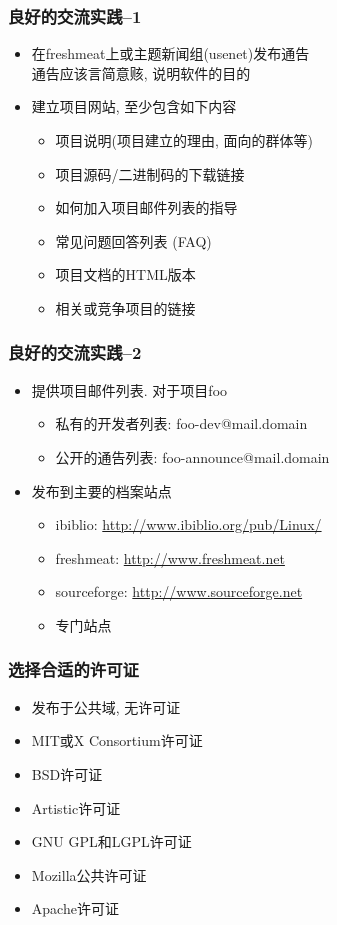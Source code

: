 \documentclass[compress]{beamer}
\begin{document}
\begin{frame}
\frametitle{良好的交流实践--1}
\begin{itemize}
\item 在freshmeat上或主题新闻组(usenet)发布通告\\
通告应该言简意赅, 说明软件的目的
\item 建立项目网站, 至少包含如下内容
    \begin{itemize}
    \item 项目说明(项目建立的理由, 面向的群体等)
    \item 项目源码/二进制码的下载链接
    \item 如何加入项目邮件列表的指导
    \item 常见问题回答列表 (FAQ)
    \item 项目文档的HTML版本
    \item 相关或竞争项目的链接
    \end{itemize}
\end{itemize}


\end{frame}

\begin{frame}
\frametitle{良好的交流实践--2}
\begin{itemize}
\item 提供项目邮件列表. 对于项目foo
    \begin{itemize}
    \item 私有的开发者列表: foo-dev@mail.domain
    \item 公开的通告列表: foo-announce@mail.domain
    \end{itemize}
\item 发布到主要的档案站点
    \begin{itemize}
    \item ibiblio: \href{http://www.ibiblio.org/pub/Linux/}{http://www.ibiblio.org/pub/Linux/}
    \item freshmeat: \href{http://www.freshmeat.net}{http://www.freshmeat.net}
    \item sourceforge: \href{http://www.sourceforge.net}{http://www.sourceforge.net}
    \item 专门站点
    \end{itemize}
\end{itemize}

\end{frame}

\begin{frame}
\frametitle{选择合适的许可证}
\begin{itemize}
\item 发布于公共域, 无许可证
\item MIT或X Consortium许可证
\item BSD许可证
\item Artistic许可证
\item GNU GPL和LGPL许可证
\item Mozilla公共许可证
\item Apache许可证
\end{itemize}

\end{frame}
\end{document}
